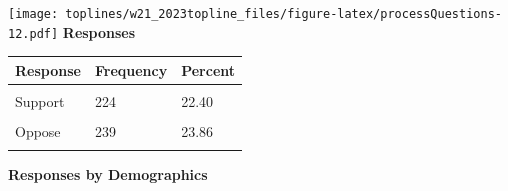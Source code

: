 \documentclass[]{article}
\begin{document}
\texttt{[image: toplines/w21\_2023topline\_files/figure-latex/processQuestions-12.pdf]}
\textbf{Responses}

\begin{tabu} to 
\toprule
Response & Frequency & Percent\\
\midrule
{} &  & \\
Support & 224 & 22.40\\
 &  & \\
Oppose & 239 & 23.86\\
 &  & \\
\bottomrule
\end{tabu}

\textbf{Responses by Demographics}\begingroup\fontsize{7}{9}\selectfont
\end{document}
